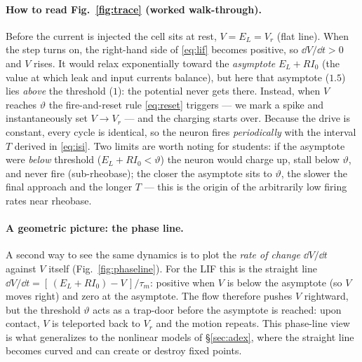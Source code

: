\documentclass[11pt]{article}
\begin{document}
\paragraph{How to read Fig.~\ref{fig:trace} (worked walk-through).}
Before the current is injected the cell sits at rest, $V=E_L=V_r$ (flat line). When the step turns
on, the right-hand side of \eqref{eq:lif} becomes positive, so $\dd V/\dd t>0$ and $V$ rises. It
would relax exponentially toward the \emph{asymptote} $E_L+RI_0$ (the value at which leak and input
currents balance), but here that asymptote ($1.5$) lies \emph{above} the threshold ($1$): the
potential never gets there. Instead, when $V$ reaches $\vartheta$ the fire-and-reset rule
\eqref{eq:reset} triggers --- we mark a spike and instantaneously set $V\!\to\!V_r$ --- and the
charging starts over. Because the drive is constant, every cycle is identical, so the neuron fires
\emph{periodically} with the interval $T$ derived in \eqref{eq:isi}. Two limits are worth noting for
students: if the asymptote were \emph{below} threshold ($E_L+RI_0<\vartheta$) the neuron would
charge up, stall below $\vartheta$, and never fire (sub-rheobase); the closer the asymptote sits to
$\vartheta$, the slower the final approach and the longer $T$ --- this is the origin of the
arbitrarily low firing rates near rheobase.

\paragraph{A geometric picture: the phase line.}
A second way to see the same dynamics is to plot the \emph{rate of change} $\dd V/\dd t$ against
$V$ itself (Fig.~\ref{fig:phaseline}). For the LIF this is the straight line $\dd V/\dd t=
[\,(E_L+RI_0)-V\,]/\tau_m$: positive when $V$ is below the asymptote (so $V$ moves right) and zero
at the asymptote. The flow therefore pushes $V$ rightward, but the threshold $\vartheta$ acts as a
trap-door before the asymptote is reached: upon contact, $V$ is teleported back to $V_r$ and the
motion repeats. This phase-line view is what generalizes to the nonlinear models of
\S\ref{sec:adex}, where the straight line becomes curved and can create or destroy fixed points.
\end{document}
